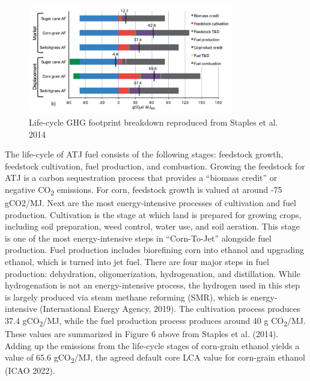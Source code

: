 \documentclass[12pt]{article}
\begin{document}
\begin{figure}[H]
\centering
\includegraphics[width=0.8\textwidth]{Fig 6.png} %
\caption{Life-cycle GHG footprint breakdown reproduced from Staples et al. 2014}
\label{figure 6}
\end{figure}


 The life-cycle of ATJ fuel consists of the following stages: feedstock growth, feedstock cultivation, fuel production, and combustion. Growing the feedstock for ATJ is a carbon sequestration process that provides a “biomass credit” or negative CO\textsubscript{2} emissions. For corn, feedstock growth is valued at around -75 gCO2/MJ. Next are the most energy-intensive processes of cultivation and fuel production. Cultivation is the stage at which land is prepared for growing crops, including soil preparation, weed control, water use, and soil aeration. This stage is one of the most energy-intensive steps in “Corn-To-Jet” alongside fuel production. Fuel production includes biorefining corn into ethanol and upgrading ethanol, which is turned into jet fuel. There are four major steps in fuel production: dehydration, oligomerization, hydrogenation, and distillation. While hydrogenation is not an energy-intensive process, the hydrogen used in this step is largely produced via steam methane reforming (SMR), which is energy-intensive (International Energy Agency, 2019).  The cultivation process produces 37.4 gCO\textsubscript{2}/MJ, while the fuel production process produces around 40 g CO\textsubscript{2}/MJ. These values are summarized in Figure 6 above from Staples et al. (2014). Adding up the emissions from the life-cycle stages of corn-grain ethanol yields a value of 65.6 gCO\textsubscript{2}/MJ, the agreed default core LCA value for corn-grain ethanol (ICAO 2022).
\end{document}
